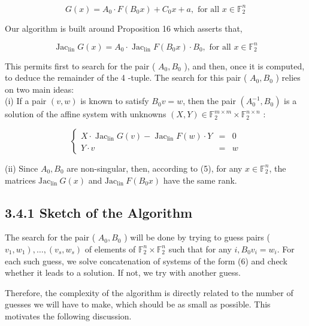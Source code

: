 \documentclass[10pt]{article}
\begin{document}
$$
G(x)=A_{0} \cdot F\left(B_{0} x\right)+C_{0} x+a, \text { for all } x \in \mathbb{F}_{2}^{n}
$$

Our algorithm is built around Proposition 16 which asserts that,


\begin{equation*}
\operatorname{Jac}_{\operatorname{lin}} G(x)=A_{0} \cdot \operatorname{Jac}_{\operatorname{lin}} F\left(B_{0} x\right) \cdot B_{0}, \text { for all } x \in \mathbb{F}_{2}^{n} \tag{5}
\end{equation*}


This permits first to search for the pair ( $A_{0}, B_{0}$ ), and then, once it is computed, to deduce the remainder of the 4 -tuple. The search for this pair ( $A_{0}, B_{0}$ ) relies on two main ideas:\\
(i) If a pair $(v, w)$ is known to satisfy $B_{0} v=w$, then the pair $\left(A_{0}^{-1}, B_{0}\right)$ is a solution of the affine system with unknowns $(X, Y) \in \mathbb{F}_{2}^{m \times m} \times \mathbb{F}_{2}^{n \times n}$ :

\[
\left\{\begin{array}{clc}
X \cdot \operatorname{Jac}_{\operatorname{lin}} G(v)-\operatorname{Jac}_{\operatorname{lin}} F(w) \cdot Y & = & 0  \tag{6}\\
Y \cdot v & = & w
\end{array}\right.
\]

(ii) Since $A_{0}, B_{0}$ are non-singular, then, according to (5), for any $x \in \mathbb{F}_{2}^{n}$, the matrices $\mathrm{Jac}_{\text {lin }} G(x)$ and $\mathrm{Jac}_{\text {lin }} F\left(B_{0} x\right)$ have the same rank.

\subsection*{3.4.1 Sketch of the Algorithm}
The search for the pair ( $A_{0}, B_{0}$ ) will be done by trying to guess pairs ( $\left.v_{1}, w_{1}\right), \ldots,\left(v_{s}, w_{s}\right)$ of elements of $\mathbb{F}_{2}^{n} \times \mathbb{F}_{2}^{n}$ such that for any $i, B_{0} v_{i}=w_{i}$. For each such guess, we solve concatenation of systems of the form (6) and check whether it leads to a solution. If not, we try with another guess.

Therefore, the complexity of the algorithm is directly related to the number of guesses we will have to make, which should be as small as possible. This motivates the following discussion.
\end{document}
